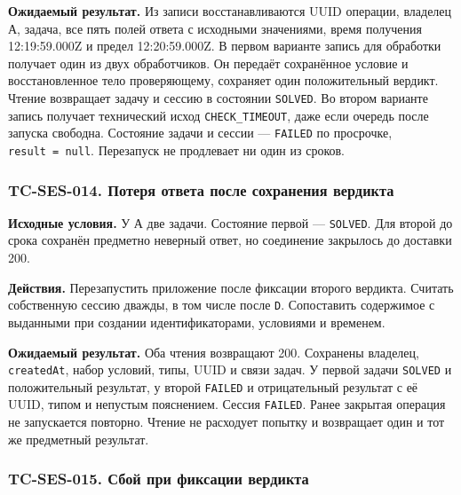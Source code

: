 \documentclass[12pt,a4paper]{article}
\begin{document}
\textbf{Ожидаемый результат.} Из записи восстанавливаются UUID операции, владелец А, задача, все пять полей ответа с исходными значениями, время получения 12:19:59.000Z и предел 12:20:59.000Z. В первом варианте запись для обработки получает один из двух обработчиков. Он передаёт сохранённое условие и восстановленное тело проверяющему, сохраняет один положительный вердикт. Чтение возвращает задачу и сессию в состоянии \texttt{SOLVED}. Во втором варианте запись получает технический исход \texttt{CHECK\_\allowbreak{}TIMEOUT}, даже если очередь после запуска свободна. Состояние задачи и сессии --- \texttt{FAILED} по просрочке, \texttt{result\ =\ null}. Перезапуск не продлевает ни один из сроков.

\subsubsection{TC-SES-014. Потеря ответа после сохранения вердикта}\label{tc-ses-014-ux43fux43eux442ux435ux440ux44f-ux43eux442ux432ux435ux442ux430-ux43fux43eux441ux43bux435-ux441ux43eux445ux440ux430ux43dux435ux43dux438ux44f-ux432ux435ux440ux434ux438ux43aux442ux430}

\hypertarget{tc-ses-014-потеря-ответа-после-сохранения-вердикта}{}

\hypertarget{tc-ses-014}{}

\textbf{Исходные условия.} У А две задачи. Состояние первой --- \texttt{SOLVED}. Для второй до срока сохранён предметно неверный ответ, но соединение закрылось до доставки 200.

\textbf{Действия.} Перезапустить приложение после фиксации второго вердикта. Считать собственную сессию дважды, в том числе после \texttt{D}. Сопоставить содержимое с выданными при создании идентификаторами, условиями и временем.

\textbf{Ожидаемый результат.} Оба чтения возвращают 200. Сохранены владелец, \texttt{createdAt}, набор условий, типы, UUID и связи задач. У первой задачи \texttt{SOLVED} и положительный результат, у второй \texttt{FAILED} и отрицательный результат с её UUID, типом и непустым пояснением. Сессия \texttt{FAILED}. Ранее закрытая операция не запускается повторно. Чтение не расходует попытку и возвращает один и тот же предметный результат.

\subsubsection{TC-SES-015. Сбой при фиксации вердикта}\label{tc-ses-015-ux441ux431ux43eux439-ux43fux440ux438-ux444ux438ux43aux441ux430ux446ux438ux438-ux432ux435ux440ux434ux438ux43aux442ux430}
\end{document}
